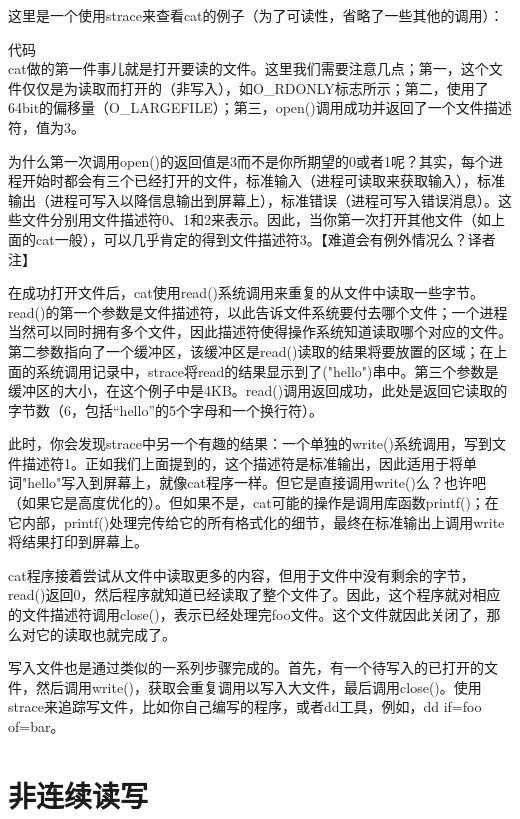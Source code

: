 这里是一个使用strace来查看cat的例子（为了可读性，省略了一些其他的调用）：

代码\\

cat做的第一件事儿就是打开要读的文件。这里我们需要注意几点；第一，这个文件仅仅是为读取而打开的（非写入），如O\_RDONLY标志所示；第二，使用了64bit的偏移量（O\_LARGEFILE）；第三，open()调用成功并返回了一个文件描述符，值为3。

为什么第一次调用open()的返回值是3而不是你所期望的0或者1呢？其实，每个进程开始时都会有三个已经打开的文件，标准输入（进程可读取来获取输入），标准输出（进程可写入以降信息输出到屏幕上），标准错误（进程可写入错误消息）。这些文件分别用文件描述符0、1和2来表示。因此，当你第一次打开其他文件（如上面的cat一般），可以几乎肯定的得到文件描述符3。【难道会有例外情况么？译者注】

在成功打开文件后，cat使用read()系统调用来重复的从文件中读取一些字节。read()的第一个参数是文件描述符，以此告诉文件系统要付去哪个文件；一个进程当然可以同时拥有多个文件，因此描述符使得操作系统知道读取哪个对应的文件。第二参数指向了一个缓冲区，该缓冲区是read()读取的结果将要放置的区域；在上面的系统调用记录中，strace将read的结果显示到了("hello")串中。第三个参数是缓冲区的大小，在这个例子中是4KB。read()调用返回成功，此处是返回它读取的字节数（6，包括“hello”的5个字母和一个换行符）。

此时，你会发现strace中另一个有趣的结果：一个单独的write()系统调用，写到文件描述符1。正如我们上面提到的，这个描述符是标准输出，因此适用于将单词"hello"写入到屏幕上，就像cat程序一样。但它是直接调用write()么？也许吧（如果它是高度优化的）。但如果不是，cat可能的操作是调用库函数printf()；在它内部，printf()处理完传给它的所有格式化的细节，最终在标准输出上调用write将结果打印到屏幕上。

cat程序接着尝试从文件中读取更多的内容，但用于文件中没有剩余的字节，read()返回0，然后程序就知道已经读取了整个文件了。因此，这个程序就对相应的文件描述符调用close()，表示已经处理完foo文件。这个文件就因此关闭了，那么对它的读取也就完成了。

写入文件也是通过类似的一系列步骤完成的。首先，有一个待写入的已打开的文件，然后调用write()，获取会重复调用以写入大文件，最后调用close()。使用strace来追踪写文件，比如你自己编写的程序，或者dd工具，例如，dd if=foo of=bar。



\section{非连续读写}

